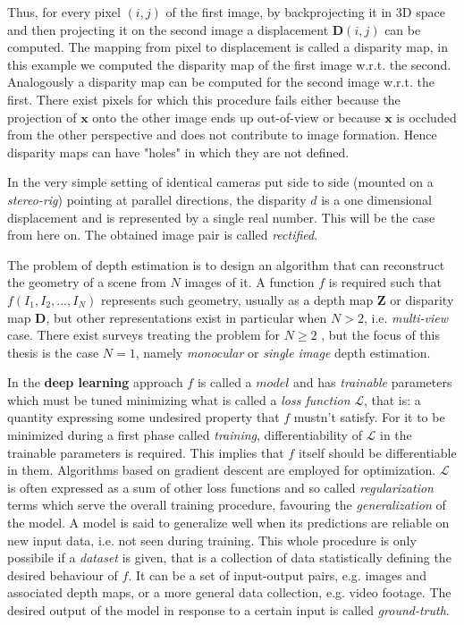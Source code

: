 Thus, for every pixel $(i, j)$ of the first image, by backprojecting it in 3D space and then projecting it on the second image a displacement $\mathbf{D}(i,j)$ can be computed.
The mapping from pixel to displacement is called a disparity map, in this example we computed the disparity map of the first image w.r.t. the second.
Analogously a disparity map can be computed for the second image w.r.t. the first.
There exist pixels for which this procedure fails either because the projection of $\mathbf{x}$ onto the other image ends up out-of-view or because $\mathbf{x}$ is occluded from the other perspective and does not contribute to image formation.
Hence disparity maps can have "holes" in which they are not defined.

In the very simple setting of identical cameras put side to side (mounted on a \textit{stereo-rig}) pointing at parallel directions, the disparity $d$ is a one dimensional displacement and is represented by a single real number.
This will be the case from here on. The obtained image pair is called \textit{rectified}.


The problem of depth estimation is to design an algorithm that can reconstruct the geometry of a scene from $N$ images of it.
A function $f$ is required such that $f(I_{1}, I_{2}, ..., I_{N})$ represents such geometry, usually as a depth map $\mathbf{Z}$ or disparity map $\mathbf{D}$, but other representations exist in particular when $N > 2$, i.e. \textit{multi-view} case.
There exist surveys treating the problem for $N \geq 2$ \cite{correspondance, stereo}, but the focus of this thesis is the case $N = 1$, namely \textit{monocular} or \textit{single image} depth estimation.


In the \textbf{deep learning} approach $f$ is called a $model$ and has \textit{trainable} parameters which must be tuned minimizing what is called a \textit{loss function} $\mathcal{L}$, that is: a quantity expressing some undesired property that $f$ mustn't satisfy.
For it to be minimized during a first phase called \textit{training}, differentiability of $\mathcal{L}$ in the trainable parameters is required.
This implies that $f$ itself should be differentiable in them.
Algorithms based on gradient descent are employed for optimization.
$\mathcal{L}$ is often expressed as a sum of other loss functions and so called \textit{regularization} terms which serve the overall training procedure, favouring the \textit{generalization} of the model.
A model is said to generalize well when its predictions are reliable on new input data, i.e. not seen during training.
This whole procedure is only possibile if a \textit{dataset} is given, that is a collection of data statistically defining the desired behaviour of $f$.
It can be a set of input-output pairs, e.g. images and associated depth maps, or a more general data collection, e.g. video footage.
The desired output of the model in response to a certain input is called \textit{ground-truth}.

